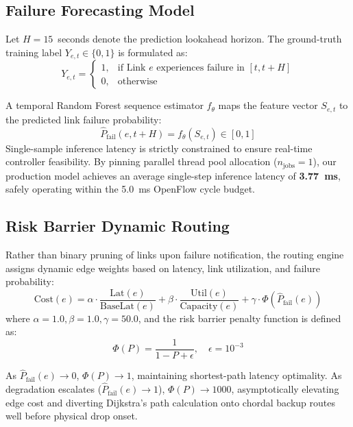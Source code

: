 \documentclass[journal,10pt,twocolumn]{IEEEtran}
\begin{document}
\subsection{Failure Forecasting Model}
Let $H = 15$~seconds denote the prediction lookahead horizon. The ground-truth training label $Y_{e, t} \in \{0, 1\}$ is formulated as:
\begin{equation}
Y_{e, t} = \begin{cases} 
1, & \text{if Link } e \text{ experiences failure in } [t, t + H] \\
0, & \text{otherwise}
\end{cases}
\label{eq:labeling}
\end{equation}

A temporal Random Forest sequence estimator $f_\theta$ maps the feature vector $S_{e, t}$ to the predicted link failure probability:
\begin{equation}
\hat{P}_{\text{fail}}(e, t + H) = f_\theta(S_{e, t}) \in [0, 1]
\end{equation}
Single-sample inference latency is strictly constrained to ensure real-time controller feasibility. By pinning parallel thread pool allocation ($n_{\text{jobs}} = 1$), our production model achieves an average single-step inference latency of \textbf{3.77~ms}, safely operating within the 5.0~ms OpenFlow cycle budget.

\subsection{Risk Barrier Dynamic Routing}
Rather than binary pruning of links upon failure notification, the routing engine assigns dynamic edge weights based on latency, link utilization, and failure probability:
\begin{equation}
\text{Cost}(e) = \alpha \cdot \frac{\text{Lat}(e)}{\text{BaseLat}(e)} + \beta \cdot \frac{\text{Util}(e)}{\text{Capacity}(e)} + \gamma \cdot \Phi(\hat{P}_{\text{fail}}(e))
\label{eq:cost_function}
\end{equation}
where $\alpha=1.0, \beta=1.0, \gamma=50.0$, and the risk barrier penalty function is defined as:
\begin{equation}
\Phi(P) = \frac{1}{1 - P + \epsilon}, \quad \epsilon = 10^{-3}
\label{eq:barrier}
\end{equation}

As $\hat{P}_{\text{fail}}(e) \to 0$, $\Phi(P) \to 1$, maintaining shortest-path latency optimality. As degradation escalates ($\hat{P}_{\text{fail}}(e) \to 1$), $\Phi(P) \to 1000$, asymptotically elevating edge cost and diverting Dijkstra's path calculation onto chordal backup routes well before physical drop onset.
\end{document}
